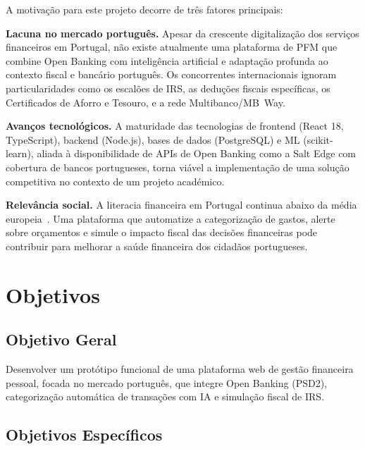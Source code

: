 A motivação para este projeto decorre de três fatores principais:

\textbf{Lacuna no mercado português.} Apesar da crescente digitalização dos serviços financeiros em Portugal, não existe atualmente uma plataforma de \ac{PFM} que combine Open Banking com inteligência artificial e adaptação profunda ao contexto fiscal e bancário português. Os concorrentes internacionais ignoram particularidades como os escalões de \ac{IRS}, as deduções fiscais específicas, os Certificados de Aforro e Tesouro, e a rede Multibanco/MB~Way.

\textbf{Avanços tecnológicos.} A maturidade das tecnologias de frontend (React 18, TypeScript), backend (Node.js), bases de dados (PostgreSQL) e \ac{ML} (scikit-learn), aliada à disponibilidade de APIs de Open Banking como a Salt Edge com cobertura de bancos portugueses, torna viável a implementação de uma solução competitiva no contexto de um projeto académico.

\textbf{Relevância social.} A literacia financeira em Portugal continua abaixo da média europeia~\cite{oecd2023}. Uma plataforma que automatize a categorização de gastos, alerte sobre orçamentos e simule o impacto fiscal das decisões financeiras pode contribuir para melhorar a saúde financeira dos cidadãos portugueses.


\section{Objetivos}
\label{sec:objetivos}

\subsection{Objetivo Geral}

Desenvolver um protótipo funcional de uma plataforma web de gestão financeira pessoal, focada no mercado português, que integre Open Banking (\ac{PSD2}), categorização automática de transações com \ac{IA} e simulação fiscal de \ac{IRS}.

\subsection{Objetivos Específicos}

